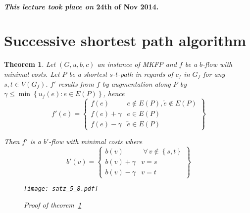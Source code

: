 \documentclass{article}
\newtheorem{theorem}{Theorem}
\newcommand{\set}[1]{\left\{#1\right\}}
\newcommand{\dateref}[1]{\paragraph{\textit{This lecture took place on} #1.}}
\newcommand{\gath}[2]{$#1$-$#2$-path} %
\newcommand{\fall}{\;\forall\,}
\begin{document}
\dateref{24th of Nov 2014}

\section{Successive shortest path algorithm}

\begin{theorem}\label{satz-5.8}
  Let $(G, u, b, c)$ an instance of MKFP and $f$ be a $b$-flow with minimal costs.
  Let $P$ be a shortest \gath st in regards of $c_f$ in $G_f$ for any $s, t \in V(G_f)$.
  $f'$ results from $f$ by augmentation along $P$ by $\gamma \leq \min\set{u_f(e): e \in E(P)}$,
  hence
  \[
    f'(e) = \left\{\begin{array}{lc}
      f(e) & e \notin E(P), \overleftarrow{e} \notin E(P) \\
      f(e) + \gamma & e \in E(P) \\
      f(e) - \gamma & \overleftarrow{e} \in E(P)
    \end{array}\right\}
  \]

  Then $f'$ is a $b'$-flow with minimal costs where
  \[
    b'(v) = \left\{\begin{array}{lc}
      b(v) & \fall v \notin \set{s,t} \\
      b(v) + \gamma & v = s \\
      b(v) - \gamma & v = t
    \end{array}\right\}
  \]

  \begin{figure}[h]
   \begin{center}
    \texttt{[image: satz\_5\_8.pdf]}
    \caption{Proof of theorem~\ref{satz-5.8}}
   \end{center}
  \end{figure}
\end{theorem}
\end{document}
